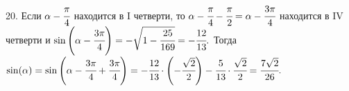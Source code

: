 20. Если $\alpha-\cfrac{\pi}{4}$ находится в I четверти, то $\alpha-\cfrac{\pi}{4}-\cfrac{\pi}{2}=\alpha-\cfrac{3\pi}{4}$ находится в IV четверти и $\sin\left(\alpha-\cfrac{3\pi}{4}\right)=-\sqrt{1-\cfrac{25}{169}}=-\cfrac{12}{13}.$ Тогда $\sin(\alpha)=\sin\left(\alpha-\cfrac{3\pi}{4}+\cfrac{3\pi}{4}\right)=
-\cfrac{12}{13}\cdot\left(-\cfrac{\sqrt{2}}{2}\right)-\cfrac{5}{13}\cdot\cfrac{\sqrt{2}}{2}=\cfrac{7\sqrt{2}}{26}.$\\
